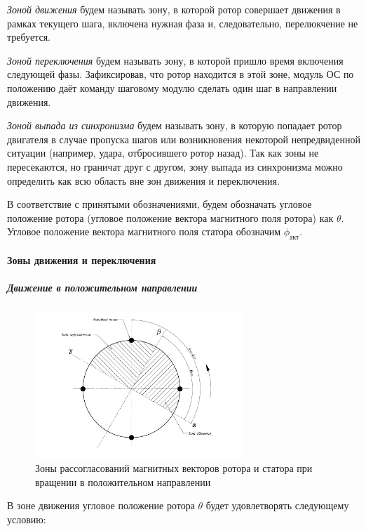 \textit{Зоной движения} будем называть зону, в которой ротор совершает движения в рамках
текущего шага, включена нужная фаза и, следовательно, перелюкчение не требуется.

\textit{Зоной переключения} будем называть зону, в которой пришло время включения
следующей фазы. Зафиксировав, что ротор находится в этой зоне, модуль ОС по положению
даёт команду шаговому модулю сделать один шаг в направлении движения.

\textit{Зоной выпада из синхронизма} будем называть зону, в которую попадает ротор
двигателя в случае пропуска шагов или возникновения некоторой непредвиденной ситуации
(например, удара, отбросившего ротор назад). Так как зоны не пересекаются, но граничат
друг с другом, зону выпада из синхронизма можно определить как всю область вне зон
движения и переключения.

В соответствие с принятыми обозначениями, будем обозначать угловое положение
ротора (угловое положение вектора магнитного поля ротора) как $\theta$.
Угловое положение вектора магнитного поля статора обозначим $\phi_\textit{акт}$.

\paragraph{Зоны движения и переключения}
\subparagraph{Движение в положительном направлении}
\begin{figure}
    \centering
    \includegraphics[width=0.7\textwidth, keepaspectratio]
                    {./src/pictures/feedback_control/pole_switch_zones_with_positive_dir}
    \caption{Зоны рассогласований магнитных векторов ротора и статора при вращении в положительном направлении}
    \label{pole_switch_zones_with_positive_dir}
\end{figure}

В зоне движения угловое положение ротора $\theta$ будет удовлетворять следующему условию:

